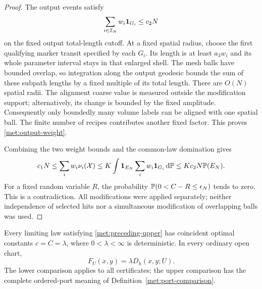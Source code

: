 \begin{proof}
The output events satisfy
\begin{equation}
 \sum_{i\in\mathcal I_N}w_i\1_{G_i}
 \leq c_2N
 \label{met:output-weight}
\end{equation}
on the fixed output total-length cutoff.  At a fixed spatial radius,
choose the first qualifying marker transit specified by each $G_i$.
Its length is at least $a_3w_i$ and its whole parameter interval
stays in that enlarged shell.  The mesh balls have bounded overlap,
so integration along the output geodesic bounds the sum of these
subpath lengths by a fixed multiple of its total length.  There are $O(N)$ spatial radii.  The
alignment coarse value is measured outside the modification support;
alternatively, its change is bounded by the fixed amplitude.
Consequently only boundedly many volume labels can be aligned with
one spatial ball.  The finite number of recipes contributes another
fixed factor.  This proves \eqref{met:output-weight}.

Combining the two weight bounds and the common-law domination gives
\[
 c_1N
 \leq\sum_iw_i\nu_i(\mathcal X)
 \leq K\int\mathbf 1_{E_N}\sum_iw_i\mathbf 1_{G_i}\,\mathrm d\mathbb P
 \leq Kc_2N\mathbb P(E_N).
\]
For a fixed random variable $R$, the probability
$\mathbb P(0<C-R\leq\epsilon_N)$ tends to zero.  This is a
contradiction.  All modifications were applied separately; neither
independence of selected hits nor a simultaneous modification of
overlapping balls was used.
\end{proof}

\begin{theorem}
\label{met:rigidity}
Every limiting law satisfying \eqref{met:preceding-upper} has
coincident optimal constants $c=C=\lambda$, where
$0<\lambda<\infty$ is deterministic.  In every ordinary open chart,
\[
 F_U(x,y)=\lambda D_h(x,y;U).
\]
The lower comparison applies to all certificates; the upper
comparison has the complete ordered-port meaning of
Definition~\ref{met:port-comparison}.
\end{theorem}

